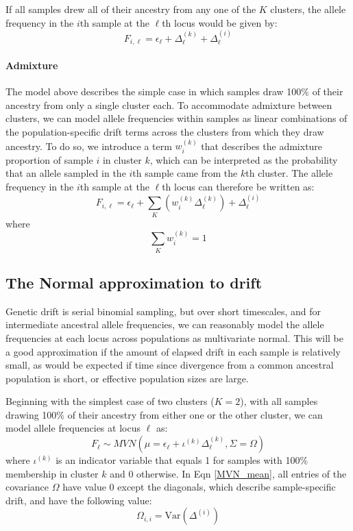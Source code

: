 \documentclass[12pt]{article}
\begin{document}
If all samples drew all of their ancestry from any one of the $K$ clusters,
the  allele frequency in the $i$th sample at the $\ell$th locus would be given by:
\begin{equation}
F_{i,\ell} = \epsilon_{\ell} + \Delta^{(k)}_{\ell} + \Delta^{(i)}_{\ell}
\label{drift_terms_no_admix}
\end{equation}

\paragraph{Admixture} 
The model above describes the simple case 
in which samples draw 100\% of their ancestry from only a single cluster each. 
To accommodate admixture between clusters, 
we can model allele frequencies within samples as linear combinations of the population-specific 
drift terms across the clusters from which they draw ancestry.
To do so, we introduce a term $w^{(k)}_{i}$ that describes the admixture proportion of sample $i$ in cluster $k$,
which can be interpreted as the probability that an allele sampled in the $i$th sample came from the $k$th cluster.
The allele frequency in the $i$th sample at the $\ell$th locus can therefore be written as:
%
\begin{equation}
F_{i,\ell} = \epsilon_{\ell} + \sum\limits_{K} \left( w^{(k)}_{i} \Delta^{(k)}_{\ell} \right) + \Delta^{(i)}_{\ell}	
\label{drift_terms_admix}
\end{equation}
%
where
%
\begin{equation}
\sum\limits_{K}w^{(k)}_{i} = 1
\end{equation}

\subsection{The Normal approximation to drift}
Genetic drift is serial binomial sampling, 
but over short timescales, and for intermediate ancestral allele frequencies, 
we can reasonably model the allele frequencies at each locus across populations as multivariate normal.
This will be a good approximation if the amount of elapsed drift in each sample is relatively small,
as would be expected if time since divergence from a common ancestral population is short,
or effective population sizes are large.

Beginning with the simplest case of two clusters ($K=2$),
with all samples drawing 100\% of their ancestry from either one or the other cluster, 
we can model allele frequencies at locus $\ell$ as:
%
\begin{equation}
F_{\ell} \sim MVN\left(\mu = \epsilon_{\ell} + \iota^{(k)}\Delta_{\ell}^{(k)}, \Sigma = \Omega	\right)
\label{MVN_mean}
\end{equation}
%
where $\iota^{(k)}$ is an indicator variable that equals 1 for samples with 100\% membership in cluster $k$
and 0 otherwise.
In Eqn \eqref{MVN_mean}, all entries of the covariance $\Omega$ have value 0 except the diagonals,
which describe sample-specific drift, and have the following value:
%
\begin{equation}
\Omega_{i,i} = \text{Var}\left( \Delta^{(i)} \right)
\label{MVN_mean_diag}
\end{equation}
\end{document}
